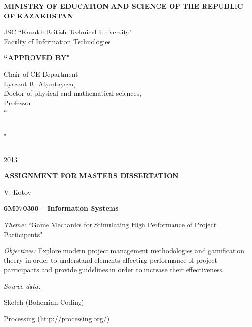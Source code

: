 \begin{titlepage}
	\pagebreak


	\begin{center}
	{\bf{\MakeUppercase{Ministry of education and science of the republic of Kazakhstan}}

		\vspace{14pt}

		JSC ``Kazakh-British Technical University"\\
		Faculty of Information Technologies}

		\vspace{14pt}
		
		\begin{flushright}
			{\bf \MakeUppercase{``Approved by"}}

			Chair of CE Department\\
			Lyazzat B. Atymtayeva,\\
			Doctor of physical and mathematical sciences,\\
			Professor\\

			\vspace{0.5\baselineskip}
			``\rule{2em}{0.4pt}" \rule{8em}{0.4pt} 2013\\
		    \end{flushright}
		
		{\bf
		\MakeUppercase{Assignment for masters dissertation}}

	\end{center}

	\setlength{\parindent}{0pt}
	\setlength{\parskip}{1ex plus 0.5ex minus 0.2ex}

	V. Kotov

	{\bf 6M070300 -- Information Systems}

	\emph{Theme:} ``Game Mechanics for Stimulating High Performance of Project Participants"
    
   \emph{Objectives:}
	Explore modern project management methodologies and gamification theory in order to understand elements affecting performance of project participants and provide guidelines in order to increase their effectiveness.
	
	\emph{Source data:}
	
	\begin{compactitem}
	\item Sketch (Bohemian Coding)
	\item Processing (\url{http://processing.org/})
	\end{compactitem}



\end{titlepage}
